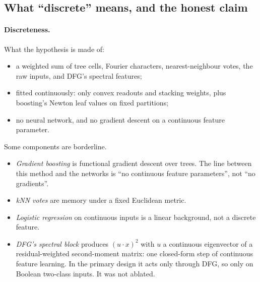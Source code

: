 \subsection{What ``discrete'' means, and the honest claim}\label{sec:discreteness}

\paragraph{Discreteness.} What the hypothesis is made of:
\begin{itemize}
\item a weighted sum of tree cells, Fourier characters, nearest-neighbour votes, the raw inputs, and DFG's spectral features;
\item fitted continuously: only convex readouts and stacking weights, plus boosting's Newton leaf values on fixed partitions;
\item no neural network, and no gradient descent on a continuous feature parameter.
\end{itemize}
Some components are borderline.
\begin{itemize}
\item \emph{Gradient boosting} is functional gradient descent over trees. The line between this method and the networks is ``no continuous feature parameters'', not ``no gradients''.
\item \emph{kNN votes} are memory under a fixed Euclidean metric.
\item \emph{Logistic regression} on continuous inputs is a linear background, not a discrete feature.
\item \emph{DFG's spectral block} produces $(u\cdot x)^2$ with $u$ a continuous eigenvector of a residual-weighted second-moment matrix: one closed-form step of continuous feature learning. In the primary design it acts only through DFG, so only on Boolean two-class inputs. It was not ablated.
\end{itemize}

